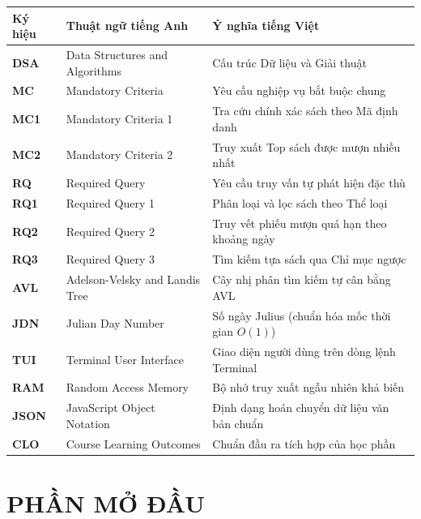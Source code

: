\documentclass[14pt,a4paper]{extarticle}
\begin{document}
\begin{table}[H]
\centering
\begingroup
{}
\setlength{\tabcolsep}{4pt}
\renewcommand{\arraystretch}{1.15}
\begin{tabularx}{\linewidth}{|>{\bfseries\centering\arraybackslash}m{2.3cm}|>{\raggedright\arraybackslash}m{5.5cm}|>{\raggedright\arraybackslash}X|}
\hline
\textbf{Ký hiệu} & \textbf{Thuật ngữ tiếng Anh} & \textbf{Ý nghĩa tiếng Việt} \\ \hline
DSA & Data Structures and Algorithms & Cấu trúc Dữ liệu và Giải thuật \\ \hline
MC & Mandatory Criteria & Yêu cầu nghiệp vụ bắt buộc chung \\ \hline
MC1 & Mandatory Criteria 1 & Tra cứu chính xác sách theo Mã định danh \\ \hline
MC2 & Mandatory Criteria 2 & Truy xuất Top sách được mượn nhiều nhất \\ \hline
RQ & Required Query & Yêu cầu truy vấn tự phát hiện đặc thù \\ \hline
RQ1 & Required Query 1 & Phân loại và lọc sách theo Thể loại \\ \hline
RQ2 & Required Query 2 & Truy vết phiếu mượn quá hạn theo khoảng ngày \\ \hline
RQ3 & Required Query 3 & Tìm kiếm tựa sách qua Chỉ mục ngược \\ \hline
AVL & Adelson-Velsky and Landis Tree & Cây nhị phân tìm kiếm tự cân bằng AVL \\ \hline
JDN & Julian Day Number & Số ngày Julius (chuẩn hóa mốc thời gian $O(1)$) \\ \hline
TUI & Terminal User Interface & Giao diện người dùng trên dòng lệnh Terminal \\ \hline
RAM & Random Access Memory & Bộ nhớ truy xuất ngẫu nhiên khả biến \\ \hline
JSON & JavaScript Object Notation & Định dạng hoán chuyển dữ liệu văn bản chuẩn \\ \hline
CLO & Course Learning Outcomes & Chuẩn đầu ra tích hợp của học phần \\ \hline
\end{tabularx}
\endgroup
\end{table}

\newpage
\pagestyle{fancy}
\setcounter{page}{1}
\section*{PHẦN MỞ ĐẦU}
\end{document}
